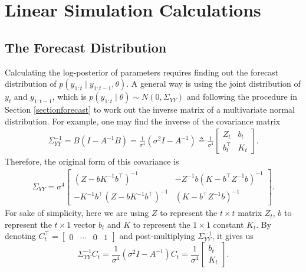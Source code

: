\setcounter{figure}{1} 

\section{Linear Simulation Calculations}\label{linearcalculation}

\subsection*{The Forecast Distribution} 

Calculating the log-posterior of parameters requires finding out the forecast distribution of $p\left(y_{1:t}\mid y_{1:t-1},\theta\right)$. A general way is using the joint distribution of $y_{t}$ and $y_{1:t-1}$, which is $p\left(y_{1:t}\mid \theta\right)\sim N\left(0,\Sigma_{YY}\right)$ and following the procedure in Section \ref{sectionforecast} to work out the inverse matrix of a multivariate normal distribution. For example, one may find the inverse of the covariance matrix 
\begin{align*}
\Sigma_{YY}^{-1} = B\left(I-A^{-1}B\right) =\frac{1}{\sigma^4}\left(\sigma^2 I-A^{-1}\right) \triangleq \frac{1}{\sigma^4}
\begin{bmatrix} 
Z_{t} & b_{t} \\
b_{t}^\top & K_{t}
\end{bmatrix}.
\end{align*}
Therefore, the original form of this covariance is 
\begin{align*} \Sigma_{YY} =\sigma^4 
\begin{bmatrix}
\left(Z-bK^{-1}b^\top\right)^{-1} & -Z^{-1}b\left(K-b^\top Z^{-1}b\right)^{-1}\\
-K^{-1}b^\top \left(Z-bK^{-1}b^\top\right)^{-1} & \left(K-b^\top Z^{-1}b\right)^{-1}
\end{bmatrix}.
\end{align*}
For sake of simplicity, here we are using $Z$ to represent the $t\times t$ matrix $Z_{t}$, $b$ to represent the $t \times 1$ vector  $b_{t}$  and $K$ to represent the $1\times 1$ constant $K_{t}$. By denoting $C_{t}^\top = \begin{bmatrix} 0 & \cdots & 0 & 1\end{bmatrix}$ and post-multiplying $\Sigma_{YY}^{-1}$, it gives us 
\begin{equation}
\Sigma_{YY}^{-1} C_{t}= \frac{1}{\sigma^4}\left(\sigma^2 I-A^{-1}\right) C_{t}= \frac{1}{\sigma^4} \begin{bmatrix} b_{t} \\ K_{t} \end{bmatrix}.
\end{equation} 

